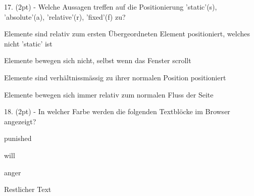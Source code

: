 \documentclass[10pt,ngerman]{examdesign}
\begin{document}
\begin{truefalse}
  17. (2pt) - Welche Aussagen treffen auf die Positionierung 'static'(s), 'absolute'(a), 'relative'(r), 'fixed'(f) zu?
  \begin{question}
     Elemente sind relativ zum ersten \"Ubergeordneten Element positioniert, welches nicht 'static' ist
  \end{question}
  \begin{question}
     Elemente bewegen sich nicht, selbst wenn das Fenster scrollt
  \end{question}
  \begin{question}
     Elemente sind verh\"altnissm\"assig zu ihrer normalen Position positioniert
  \end{question}
  \begin{question}
     Elemente bewegen sich immer relativ zum normalen Fluss der Seite
  \end{question}
\end{truefalse}

  \begin{truefalse}
    18. (2pt) - In welcher Farbe werden die folgenden Textbl\"ocke im Browser angezeigt?
    \begin{question}
       punished
    \end{question}
    \begin{question}
       will
    \end{question}
    \begin{question}
       anger
    \end{question}
    \begin{question}
       Restlicher Text
    \end{question}
  \end{truefalse}

\end{document}
